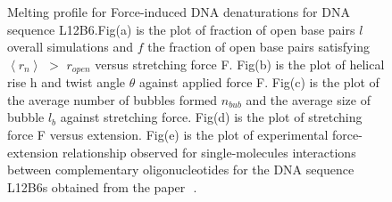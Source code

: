 \documentclass[12pt,masters,final]{UTRGVthesis}
\begin{document}
\begin{figure}[!h]
\caption{\small Melting profile for Force-induced DNA denaturations for DNA sequence L12B6.Fig(a) is the plot of fraction of open base pairs $l$ overall simulations and $f$ the fraction of open base pairs satisfying $\left<r_n\right>$ $>$ $r_{open}$ versus stretching force F. Fig(b) is the plot of helical rise h and twist angle $\theta$ against applied force F. Fig(c) is the plot of the average number of bubbles formed  $n_{bub}$ and the average  size of bubble $l_b$ against stretching force. Fig(d) is the plot of stretching force F versus extension. Fig(e) is the plot of  experimental force-extension relationship observed for single-molecules interactions between complementary oligonucleotides for the DNA sequence L12B6s obtained from the paper~\protect\cite{Pope:2001}\,.}
\label{fig:L12B6}    

\end{figure} 
%
\newpage
\end{document}
